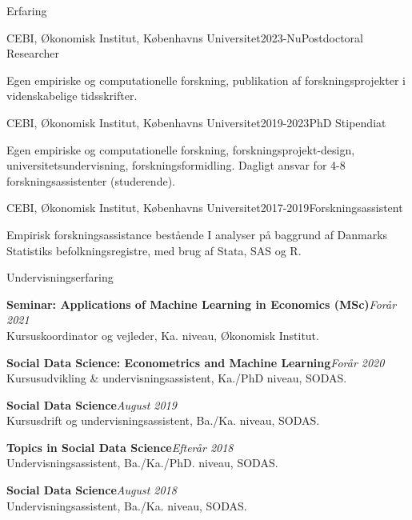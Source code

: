 \documentclass[
	11pt, %
]{resume} %
\begin{document}
\begin{rSection}{Erfaring}
    \begin{rSubsection}{CEBI, Økonomisk Institut, Københavns Universitet}{2023-Nu}{Postdoctoral Researcher}{}
        \item[] Egen empiriske og computationelle forskning, publikation af forskningsprojekter i videnskabelige tidsskrifter.
    \end{rSubsection}

    \begin{rSubsection}{CEBI, Økonomisk Institut, Københavns Universitet}{2019-2023}{PhD Stipendiat}{}
        \item[] Egen empiriske og computationelle forskning, forskningsprojekt-design, universitetsundervisning, forskningsformidling. Dagligt ansvar for 4-8 forskningsassistenter (studerende).
    \end{rSubsection}

    \begin{rSubsection}{CEBI, Økonomisk Institut, Københavns Universitet}{2017-2019}{Forskningsassistent}{}
        \item[] Empirisk forskningsassistance bestående I analyser på baggrund af Danmarks Statistiks befolkningsregistre, med brug af Stata, SAS og R.
    \end{rSubsection}


\end{rSection}

\begin{rSection}{Undervisningserfaring}

    \textbf{Seminar: Applications of Machine Learning in Economics (MSc)}\hfill \textit{Forår 2021} \\
    Kursuskoordinator og vejleder, Ka. niveau, Økonomisk Institut.

    \textbf{Social Data Science: Econometrics and Machine Learning}\hfill \textit{Forår 2020} \\
    Kursusudvikling \& undervisningsassistent, Ka./PhD niveau, SODAS.

    \textbf{Social Data Science}\hfill \textit{August 2019} \\
    Kursusdrift og undervisningsassistent, Ba./Ka. niveau, SODAS.

    \textbf{Topics in Social Data Science}\hfill \textit{Efterår 2018} \\
    Undervisningsassistent, Ba./Ka./PhD. niveau, SODAS.

    \textbf{Social Data Science}\hfill \textit{August 2018} \\
    Undervisningsassistent, Ba./Ka. niveau, SODAS.
\end{rSection}
\end{document}
